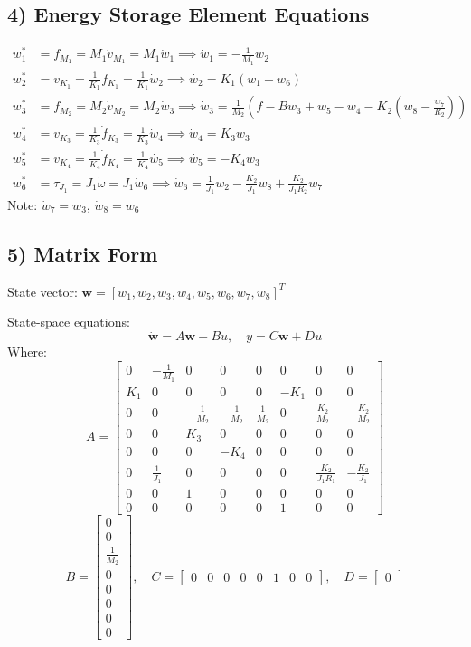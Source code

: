 \documentclass{article}
\begin{document}
\subsection*{4) Energy Storage Element Equations}
\begin{align*}
w_1^* &= f_{M_1} = M_1 \dot{v}_{M_1} = M_1 \dot{w}_1 \implies \dot{w}_1 = - \frac{1}{M_1} w_2 \\
w_2^* &= v_{K_1} = \frac{1}{K_1} \dot{f}_{K_1} = \frac{1}{K_1} \dot{w}_2 \implies \dot{w_2} = K_1 (w_1 - w_6) \\
w_3^* &= f_{M_2} = M_2 \dot{v}_{M_2} = M_2 \dot{w}_3 \implies \dot{w}_3 = \frac{1}{M_2} (f - B w_3 + w_5 - w_4 - K_2 (w_8 - \frac{w_7}{R_2})) \\
w_4^* &= v_{K_3} = \frac{1}{K_3} \dot{f}_{K_3} = \frac{1}{K_3} \dot{w}_4 \implies \dot{w}_4 = K_3 w_3 \\
w_5^* &= v_{K_4} = \frac{1}{K_4} \dot{f}_{K_4} = \frac{1}{K_4} \dot{w_5} \implies \dot{w_5} = -K_4 w_3 \\
w_6^* &= \tau_{J_1} = J_1 \dot{\omega} = J_1 \dot{w}_6 \implies \dot{w}_6 = \frac{1}{J_1} w_2 - \frac{K_2}{J_1} w_8 + \frac{K_2}{J_1 R_2} w_7
\end{align*}
Note: \( \dot{w}_7 = w_3 \), \( \dot{w}_8 = w_6 \)

\subsection*{5) Matrix Form}
State vector: \( \mathbf{w} = [w_1, w_2, w_3, w_4, w_5, w_6, w_7, w_8]^T \)

State-space equations:
\[
\mathbf{\dot{w}} = A \mathbf{w} + B u, \quad y = C \mathbf{w} + D u
\]
Where:
\[
A = \begin{bmatrix}
0 & -\frac{1}{M_1} & 0 & 0 & 0 & 0 & 0 & 0 \\
K_1 & 0 & 0 & 0 & 0 & -K_1 & 0 & 0 \\
0 & 0 & -\frac{1}{M_2} & -\frac{1}{M_2} & \frac{1}{M_2} & 0 & \frac{K_2}{M_2} & -\frac{K_2}{M_2} \\
0 & 0 & K_3 & 0 & 0 & 0 & 0 & 0 \\
0 & 0 & 0 & -K_4 & 0 & 0 & 0 & 0 \\
0 & \frac{1}{J_1} & 0 & 0 & 0 & 0 & \frac{K_2}{J_1 R_1} & -\frac{K_2}{J_1} \\
0 & 0 & 1 & 0 & 0 & 0 & 0 & 0 \\
0 & 0 & 0 & 0 & 0 & 1 & 0 & 0
\end{bmatrix}
\]
\[
B = \begin{bmatrix} 0 \\ 0 \\ \frac{1}{M_2} \\ 0 \\ 0 \\ 0 \\ 0 \\ 0 \end{bmatrix}, \quad
C = \begin{bmatrix} 0 & 0 & 0 & 0 & 0 & 1 & 0 & 0 \end{bmatrix}, \quad
D = \begin{bmatrix} 0 \end{bmatrix}
\]
\end{document}
